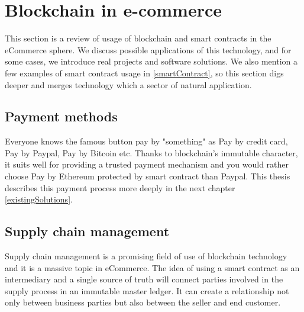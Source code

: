 \documentclass[thesis=M,english]{FITthesis}[2019/12/23]
\begin{document}






\section{Blockchain in e-commerce} \label{blockchainInEcommerce}


This section is a review of usage of blockchain and smart contracts in the eCommerce sphere. We discuss possible applications of this technology, and for some cases, we introduce real projects and software solutions. We also mention a few examples of smart contract usage in \ref{smartContract}, so this section digs deeper and merges technology which a sector of natural application.


\subsection{Payment methods}
Everyone knows the famous button pay by "something" as Pay by credit card, Pay by Paypal, Pay by Bitcoin etc. Thanks to blockchain's immutable character, it suits well for providing a trusted payment mechanism and you would rather choose Pay by Ethereum protected by smart contract than Paypal. This thesis describes this payment process more deeply in the next chapter \ref{existingSolutions}.

\subsection{Supply chain management}
Supply chain management is a promising field of use of blockchain technology and it is a massive topic in eCommerce. The idea of using a smart contract as an intermediary and a single source of truth will connect parties involved in the supply process in an immutable master ledger. It can create a relationship not only between business parties but also between the seller and end customer. 
\end{document}
